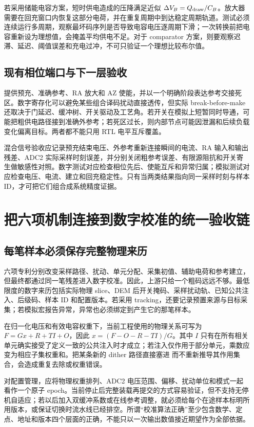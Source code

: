 若采用储能电容方案，短时供电造成的压降满足近似 \(\Delta V_B=Q_{\rm draw}/C_B\)。放大器需要在回充窗口内恢复这部分电荷，并在重复周期中到达稳定周期轨道。测试必须连续运行多周期，观察最坏码序列是否导致电容电压逐周期下滑；一次转换前把电容重新设为理想值，会掩盖平均供电不足。对于 comparator 方案，则要观察迟滞、延迟、阈值误差和充电过冲，不可只验证一个理想比较布尔值。

\subsection{现有相位端口与下一层验收}
 提供预充、准确参考、RA 放大和 AZ 使能，并以一个明确阶段表达参考交接死区。数字寄存化可以避免某些组合译码扰动直接透传，但实际 break-before-make 还取决于门延迟、缓冲树、开关驱动及工艺角。若开关在模拟上短暂同时导通，可能把粗供电路径接到准确外参考；若死区过长，则内部节点可能因泄漏和后续负载变化偏离目标。两者都不能只用 RTL 电平互斥覆盖。

混合信号验收应记录预充结束电压、外参考重新连接瞬间的电流、RA 输入和输出残差、ADC2 实际采样时刻误差，并分别关闭粗参考误差、有限源阻抗和开关寄生做敏感性对照。数字测试对应检查相位先后、使能互斥和异常归属；模拟测试对应检查电压、电流、建立和回充稳定性。只有当两类结果指向同一采样时刻与样本 ID，才可把它们组合成系统精度证据。

\section{把六项机制连接到数字校准的统一验收链}
\subsection{每笔样本必须保存完整物理来历}
六项专利分别改变采样路径、扰动、单元分配、采集初值、辅助电荷和参考建立，但最终都通过同一笔残差进入数字校准。因此，上游只给一个粗码远远不够。最低限度的数字来历包括实际物理 slice、DEM 后开关掩码、采样扰动轨、已知公共注入、后级码、样本 ID 和配置版本。若采用 tracking，还要记录预置来源与目标采集；若模拟宏报告异常，异常也必须绑定到产生它的那笔样本。

在归一化电压和有效电容权重下，当前工程使用的物理关系可写为 \(F=Gx+R+TI+O\)，因此 \(x=(F-O-R-TI)/G\)。其中 \(I\) 只有在所有相关单元确实接受了定义一致的公共注入时才成立；若注入仅作用于部分单元，乘数应变为相应子集权重和。把某条新的 dither 路径直接塞进  而不重新推导其作用集合，会造成重复去除或权重错误。

对配置管理，应将物理权重排列、ADC2 电压范围、偏移、扰动单位和模式一起看作一个原子 epoch。当前停止后完整装载再提交的方式容易验证，但不支持无停机自适应；若以后加入双缓冲系数或在线参考调整，就必须给每个在途样本标明所用版本，或保证切换时流水线已经排空。所谓“校准算法正确”至少包含数学、定点、地址和版本四个层面的正确，不能只以一次输出数值接近期望作为全部依据。

